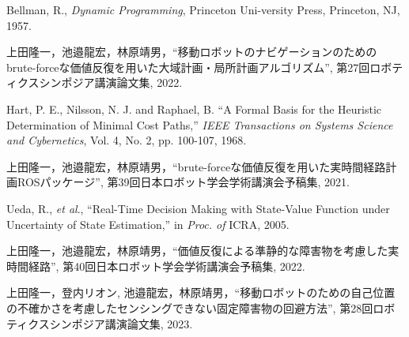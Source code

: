 \documentclass{jarticle}
\begin{document}
\footnotesize
\begin{thebibliography}{99}

	Bellman, R., {\it Dynamic Programming}, Princeton Uni-versity Press, Princeton, NJ, 1957.

	上田隆一，池邉龍宏，林原靖男，``移動ロボットのナビゲーションのためのbrute-forceな価値反復を用いた大域計画・局所計画アルゴリズム'', 
	第27回ロボティクスシンポジア講演論文集, 2022.
	
	Hart, P. E., Nilsson, N. J. and Raphael, B. ``A Formal
	Basis for the Heuristic Determination of Minimal Cost
	Paths,'' {\it IEEE Transactions on Systems Science and Cybernetics}, Vol. 4, No. 2, pp. 100-107, 1968.
	
	上田隆一，池邉龍宏，林原靖男，``brute-forceな価値反復を用いた実時間経路計画ROSパッケージ'', 
	第39回日本ロボット学会学術講演会予稿集, 2021.

	Ueda, R., {\it et al}., ``Real-Time Decision Making with State-Value Function under Uncertainty of State Estimation,''
	 in {\it Proc. of} ICRA, 2005.

	上田隆一，池邉龍宏，林原靖男，``価値反復による準静的な障害物を考慮した実時間経路'', 
	第40回日本ロボット学会学術講演会予稿集, 2022.

	上田隆一，登内リオン, 池邉龍宏，林原靖男，``移動ロボットのための自己位置の不確かさを考慮したセンシングできない固定障害物の回避方法'', 
	第28回ロボティクスシンポジア講演論文集, 2023.

\end{thebibliography}

\normalsize
\end{document}

